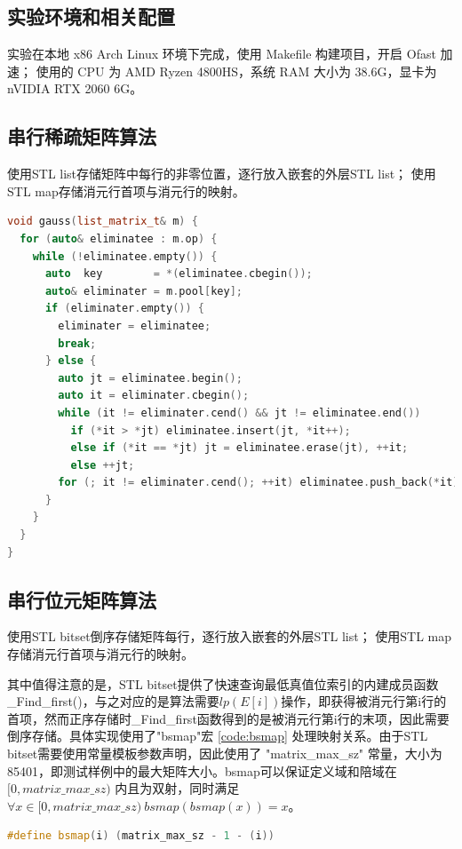 \documentclass[a4paper]{article}
\begin{document}
\subsection{实验环境和相关配置}
实验在本地 x86 Arch Linux 环境下完成，使用 Makefile 构建项目，开启 Ofast 加速；
使用的 CPU 为 AMD Ryzen 4800HS，系统 RAM 大小为 38.6G，显卡为 nVIDIA RTX 2060 6G。

\subsection{串行稀疏矩阵算法}
使用STL list存储矩阵中每行的非零位置，逐行放入嵌套的外层STL list；
使用STL map存储消元行首项与消元行的映射。

\begin{lstlisting}[frame=trbl, language={C++}, caption={稀疏矩阵消元部分}]
void gauss(list_matrix_t& m) {
  for (auto& eliminatee : m.op) {
    while (!eliminatee.empty()) {
      auto  key        = *(eliminatee.cbegin());
      auto& eliminater = m.pool[key];
      if (eliminater.empty()) {
        eliminater = eliminatee;
        break;
      } else {
        auto jt = eliminatee.begin();
        auto it = eliminater.cbegin();
        while (it != eliminater.cend() && jt != eliminatee.end())
          if (*it > *jt) eliminatee.insert(jt, *it++);
          else if (*it == *jt) jt = eliminatee.erase(jt), ++it;
          else ++jt;
        for (; it != eliminater.cend(); ++it) eliminatee.push_back(*it);
      }
    }
  }
}
\end{lstlisting}

\subsection{串行位元矩阵算法}
使用STL bitset倒序存储矩阵每行，逐行放入嵌套的外层STL list；
使用STL map存储消元行首项与消元行的映射。

其中值得注意的是，STL bitset提供了快速查询最低真值位索引的内建成员函数\_Find\_first()，与之对应的是算法需要$lp(E[i])$操作，即获得被消元行第i行的首项，然而正序存储时\_Find\_first函数得到的是被消元行第i行的末项，因此需要倒序存储。具体实现使用了"bsmap"宏 \ref{code:bsmap} 处理映射关系。由于STL bitset需要使用常量模板参数声明，因此使用了 "matrix\_max\_sz" 常量，大小为 85401，即测试样例中的最大矩阵大小。bsmap可以保证定义域和陪域在 $[0, matrix\_max\_sz)$ 内且为双射，同时满足 $\forall{x \in [0, matrix\_max\_sz)}\ bsmap(bsmap(x)) = x$。
\begin{lstlisting}[frame=trbl, language={C++}, caption={bsmap 宏}, label = {code:bsmap}]
#define bsmap(i) (matrix_max_sz - 1 - (i))
\end{lstlisting}
\end{document}
